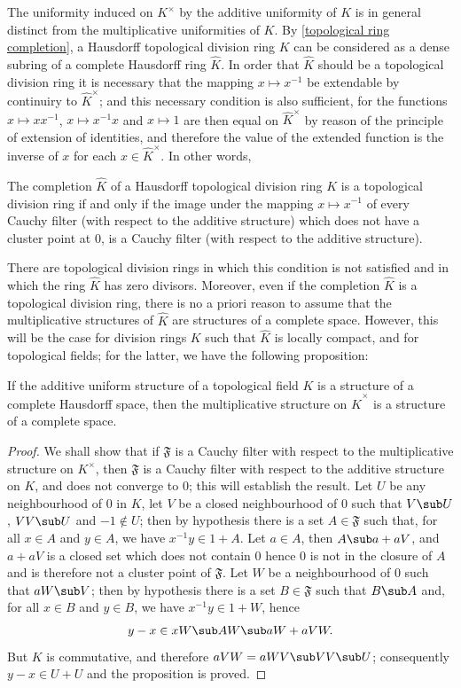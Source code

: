 The uniformity induced on $K^\times$ by the additive uniformity of $K$ is in general distinct from the multiplicative uniformities of $K$. By \cref{topological ring completion}, a Hausdorff topological division ring $K$ can be considered as a dense subring of a complete Hausdorff ring $\widehat{K}$. In order that $\widehat{K}$ should be a topological division ring it is necessary that the mapping $x\mapsto x^{-1}$ be extendable by continuiry to $\widehat{K}^\times$; and this necessary condition is also sufficient, for the functions $x\mapsto xx^{-1}$, $x\mapsto x^{-1}x$ and $x\mapsto 1$ are then equal on $\widehat{K}^\times$ by reason of the principle of extension of identities, and therefore the value of the extended function is the inverse of $x$ for each $x\in\widehat{K}^\times$. In other words,
\begin{proposition}\label{topological division ring completion iff}
The completion $\widehat{K}$ of a Hausdorff topological division ring $K$ is a topological division ring if and only if the image under the mapping $x\mapsto x^{-1}$ of every Cauchy filter (with respect to the additive structure) which does not have a cluster point at $0$, is a Cauchy filter (with respect to the additive structure).
\end{proposition}
There are topological division rings in which this condition is not satisfied and in which the ring $\widehat{K}$ has zero divisors. Moreover, even if the completion $\widehat{K}$ is a topological division ring, there is no a priori reason to assume that the multiplicative structures of $\widehat{K}$ are structures of a complete space. However, this will be the case for division rings $K$ such that $\widehat{K}$ is locally compact, and for topological fields; for the latter, we have the following proposition:
\begin{proposition}
If the additive uniform structure of a topological field $K$ is a structure of a complete Hausdorff space, then the multiplicative structure on $\widehat{K}^\times$ is a structure of a complete space.
\end{proposition}
\begin{proof}
We shall show that if $\mathfrak{F}$ is a Cauchy filter with respect to the multiplicative structure on $K^\times$, then $\mathfrak{F}$ is a Cauchy filter with respect to the additive structure on $K$, and does not converge to $0$; this will establish the result. Let $U$ be any neighbourhood of $0$ in $K$, let $V$ be a closed neighbourhood of $0$ such that $V\sub U$, $VV\sub U$ and $-1\notin U$; then by hypothesis there is a set $A\in\mathfrak{F}$ such that, for all $x\in A$ and $y\in A$, we have $x^{-1}y\in 1+A$. Let $a\in A$, then $A\sub a+aV$, and $a+aV$ is a closed set which does not contain $0$ hence $0$ is not in the closure of $A$ and is therefore not a cluster point of $\mathfrak{F}$. Let $W$ be a neighbourhood of $0$ such that $aW\sub V$; then by hypothesis there is a set $B\in\mathfrak{F}$ such that $B\sub A$ and, for all $x\in B$ and $y\in B$, we have $x^{-1}y\in 1+W$, hence
\[y-x\in xW\sub AW\sub aW+aVW.\]
But $K$ is commutative, and therefore $aVW=aWV\sub VV\sub U$; consequently $y-x\in U+U$ and the proposition is proved.
\end{proof}

